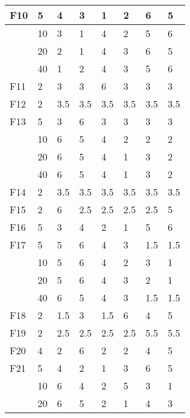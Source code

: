 \begin{longtable}{|l|l|l|l|l|l|l|l|}
F10      & 5   & 4   & 3    & 1    & 2   & 6       & 5       \\ \midrule
            & 10  & 3   & 1    & 4    & 2   & 5       & 6       \\ \cmidrule{2-8}
            & 20  & 2   & 1    & 4    & 3   & 6       & 5       \\ \cmidrule{2-8}
            & 40  & 1   & 2    & 4    & 3   & 5       & 6       \\ \midrule
F11      & 2   & 3   & 3    & 6    & 3   & 3       & 3       \\ \midrule
F12      & 2   & 3.5 & 3.5  & 3.5  & 3.5 & 3.5     & 3.5     \\ \midrule
F13      & 5   & 3   & 6    & 3    & 3   & 3       & 3       \\ \cmidrule{2-8}
            & 10  & 6   & 5    & 4    & 2   & 2       & 2       \\ \cmidrule{2-8}
            & 20  & 6   & 5    & 4    & 1   & 3       & 2       \\ \cmidrule{2-8}
            & 40  & 6   & 5    & 4    & 1   & 3       & 2       \\ \midrule
F14      & 2   & 3.5 & 3.5  & 3.5  & 3.5 & 3.5     & 3.5     \\ \midrule
F15      & 2   & 6   & 2.5  & 2.5  & 2.5 & 2.5     & 5       \\ \midrule
F16      & 5   & 3   & 4    & 2    & 1   & 5       & 6       \\ \midrule
F17      & 5   & 5   & 6    & 4    & 3   & 1.5     & 1.5     \\ \cmidrule{2-8}
            & 10  & 5   & 6    & 4    & 2   & 3       & 1       \\ \cmidrule{2-8}
            & 20  & 5   & 6    & 4    & 3   & 2       & 1       \\ \cmidrule{2-8}
            & 40  & 6   & 5    & 4    & 3   & 1.5     & 1.5     \\ \midrule
F18      & 2   & 1.5 & 3    & 1.5  & 6   & 4       & 5       \\ \midrule
F19      & 2   & 2.5 & 2.5  & 2.5  & 2.5 & 5.5     & 5.5     \\ \midrule
F20      & 4   & 2   & 6    & 2    & 2   & 4       & 5       \\ \midrule
F21      & 5   & 4   & 2    & 1    & 3   & 6       & 5       \\ \cmidrule{2-8}
            & 10  & 6   & 4    & 2    & 5   & 3       & 1       \\ \cmidrule{2-8}
            & 20  & 6   & 5    & 2    & 1   & 4       & 3       \\ \cmidrule{2-8}

\end{longtable}
